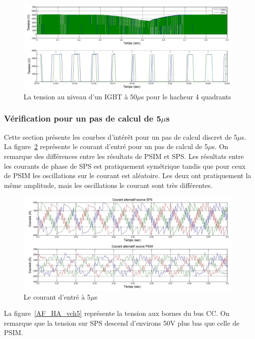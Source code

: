 \documentclass[11pt,letterpaper,final]{report}
\begin{document}
\begin{figure}[htb]
\centering
\includegraphics[scale=0.5]{Fig/Hach_AFE/50u/IGBT_ten_hach.jpg}
\caption{La tension au niveau d'un IGBT à 50$\mu$s pour le hacheur 4 quadrants}
\label{AF_HA_HAV50}
\end{figure}

\clearpage
\subsubsection{Vérification pour un pas de calcul de 5$\mu$s}
Cette section présente les courbes d'intérêt pour un pas de calcul discret de 5$\mu$s. La figure~\ref{AF_HA_cou5} représente le courant d'entré pour un pas de calcul de 5$\mu$s. On remarque des différences entre les résultats de PSIM et SPS. Les résultats entre les courants de phase de SPS est pratiquement symétrique tandis que pour ceux de PSIM les oscillations sur le courant est aléatoire. Les deux ont pratiquement la même amplitude, mais les oscillations le courant sont très différentes.


\begin{figure}[htb]
\centering
\includegraphics[scale=0.5]{Fig/Hach_AFE/5u/cour_al.jpg}
\caption{Le courant d'entré à 5$\mu$s}
\label{AF_HA_cou5}
\end{figure}

La figure~\ref{AF_HA_vch5} représente la tension aux bornes du bus CC. On remarque que la tension sur SPS descend d'environs 50V plus bas que celle de PSIM.
\end{document}
